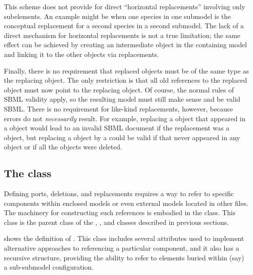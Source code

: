 This scheme does not provide for direct ``horizontal replacements''
involving only subelements.  An example might be when one species in one
submodel is the conceptual replacement for a second species in a second
submodel.  The lack of a direct mechanism for horizontal replacements is
not a true limitation; the same effect can be achieved by creating an
intermediate object in the containing model and linking it to the other
objects via replacements.

Finally, there is no requirement that replaced objects must be of the
same type as the replacing object.  The only restriction is that all old
references to the replaced object must now point to the replacing
object.  Of course, the normal rules of SBML validity apply, so the
resulting model must still make sense and be valid SBML.  There is no
requirement for like-kind replacements, however, because errors do not
\emph{necessarily} result.  For example, replacing a \Species object
that appeared in a \Reaction object would lead to an invalid SBML
document if the replacement was a \Parameter object, but replacing a
\Species object by a \Parameter could be valid if that \Species never
appeared in any \Reaction object or if all the \Reaction objects were
deleted.


\subsection{The  class}
\label{sbaseref-class}

Defining ports, deletions, and replacements requires a way to refer to
specific components within enclosed models or even external models
located in other files.  The machinery for constructing such references
is embodied in the \SBaseRef class.  This class is the parent class of
the \Port, \Deletion, \ReplacedElement and \ReplacedBy classes described
in previous sections.

 shows the definition of \SBaseRef.  This class
includes several attributes used to implement alternative approaches to
referencing a particular component, and it also has a recursive
structure, providing the ability to refer to elements buried within
(say) a sub-submodel configuration.

